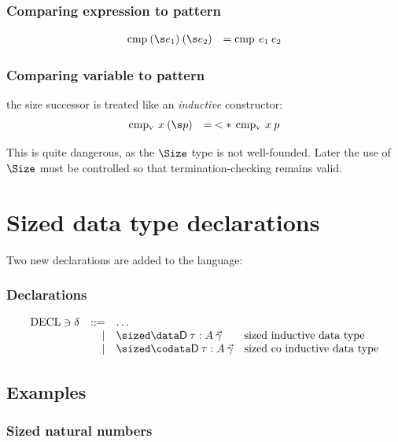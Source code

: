 \subsubsection{Comparing expression to pattern}
\[
\begin{array}[t]{ll}
\cmp \: (\s e_1) \: (\s e_2) & = \cmp \: e_1 \: e_2 \\
\end{array}
\]

\subsubsection{Comparing variable to pattern}
the size successor is treated like an \emph{inductive} constructor:
\[
\begin{array}[t]{ll}
\cmpv \: x \: (\s p) & = \: < * \: \cmpv \: x \: p\\
\end{array}
\]

This is quite dangerous, as the $\Size$ type is not well-founded.
Later the use of $\Size$ must be controlled so that termination-checking remains valid.

\section{Sized data type declarations}

\newcommand{\sizecon}[4]{#1\vdash#2\mbox{ \textbf{sizeCon} }#3\:#4}
\newcommand{\sizeuse}[4]{#1\vdash#2\mbox{ \textbf{sizeUse} }#3\:#4}

Two new declarations are added to the language:
\subsubsection{Declarations}
\[
\begin{array}{lrll}
\Decl \ni \delta & ::= & \ldots & \\
& \mid & \sized \data \DD \: \tau : A \: \vec{\gamma} & \mbox{sized inductive data type}\\ 
& \mid & \sized \codata \DD \: \tau : A \: \vec{\gamma} & \mbox{sized co inductive data type} \\
\end{array}
\]

\subsection{Examples}


\subsubsection{Sized natural numbers}

